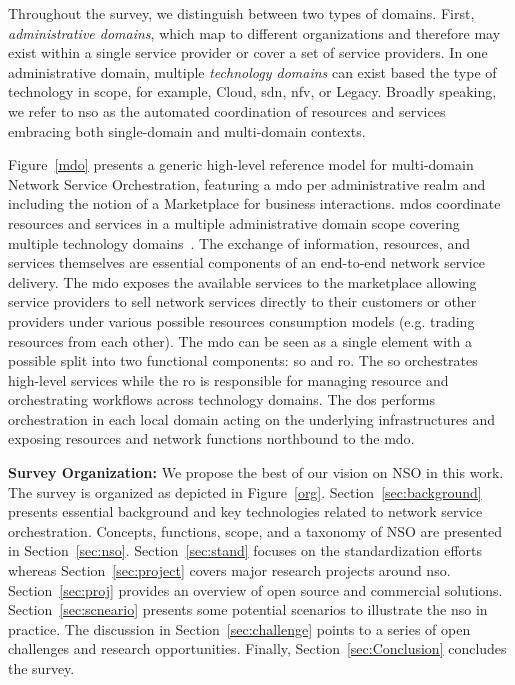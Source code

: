 Throughout the survey, we distinguish between two types of domains. First, \textit{administrative domains}, which map to different organizations and therefore may exist within a single service provider or cover a set of service providers. In one administrative domain, multiple \textit{technology domains} can exist based the type of technology in scope, for example, Cloud, \gls{sdn}, \gls{nfv}, or Legacy. 
Broadly speaking, we refer to \gls{nso} as the automated coordination of resources and services embracing both single-domain and multi-domain contexts.  

Figure~\ref{mdo} presents a generic high-level reference model for multi-domain Network Service Orchestration, featuring  a \gls{mdo} per administrative realm and including the notion of a Marketplace for business interactions. 
\glspl{mdo} coordinate resources and services in a multiple administrative domain scope covering multiple technology domains~\cite{5GPPPArchitectureWorkingGroup2016ViewArchitecture}. 
The exchange of information, resources, and services themselves are essential components of an  end-to-end network service delivery.  The \gls{mdo} exposes the available services to the marketplace allowing service providers to sell network services directly to their customers or other providers under various possible resources consumption models (e.g. trading resources from each other). 
The \gls{mdo} can be seen as a single element with a possible split into two functional components: \gls{so} and \gls{ro}. The \gls{so} orchestrates high-level services while the \gls{ro} is responsible for managing resource and orchestrating workflows  across technology domains. 
The \glspl{do} performs orchestration in each local domain acting on the underlying infrastructures and exposing resources and network functions northbound to the \gls{mdo}. 

\textbf{Survey Organization:} We propose the best of our vision on NSO in this work. The survey is organized as depicted in Figure~\ref{org}. Section~\ref{sec:background} presents essential background and key technologies related to network service orchestration. Concepts, functions, scope, and a taxonomy of NSO are presented in Section~\ref{sec:nso}. Section~\ref{sec:stand} focuses on the standardization efforts whereas Section~\ref{sec:project} covers major research projects around \gls{nso}. Section~\ref{sec:proj} provides an overview of open source and commercial solutions. Section~\ref{sec:scneario} presents some potential scenarios to illustrate the \gls{nso} in practice. The discussion in Section~\ref{sec:challenge} points to a series of open challenges and research opportunities. Finally, Section~\ref{sec:Conclusion} concludes the survey. 
